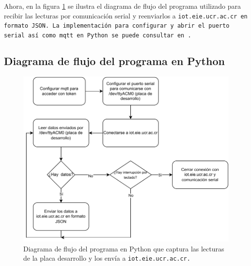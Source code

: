 Ahora, en la figura \ref{fsm-py} se ilustra el diagrama de flujo del programa utilizado para recibir las lecturas por comunicación serial y reenviarlos a \tt{iot.eie.ucr.ac.cr} en formato JSON. La implementación para configurar y abrir el puerto serial así como mqtt en Python se puede consultar en \cite{serial, mqtt}.
\subsection{Diagrama de flujo del programa en Python}
\begin{figure}[H]
    \centering
    \includegraphics[width=12cm]{Imagenes/py.pdf}
    \caption{Diagrama de flujo del programa en Python que captura las lecturas de la placa desarrollo y los envía a \tt{iot.eie.ucr.ac.cr}.}
    \label{fsm-py}
\end{figure}